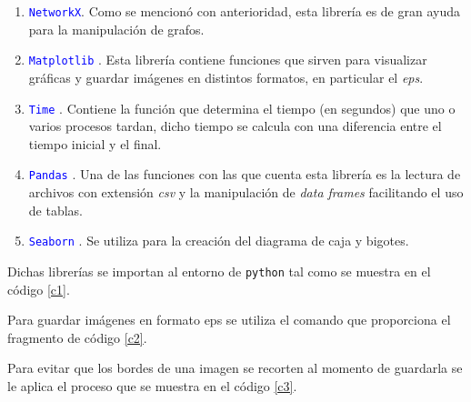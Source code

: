 \documentclass[12pt]{article}
\begin{document}
\begin{enumerate}
\item \textcolor{blue}{\texttt{NetworkX}}. Como se mencionó con anterioridad, esta librería es de gran ayuda para la manipulación de grafos.

\item \textcolor{blue}{\texttt{Matplotlib}} \cite{Mat}. Esta librería contiene funciones que sirven para visualizar gráficas y guardar imágenes en distintos formatos, en particular el \textit{eps}.
 
\item \textcolor{blue}{\texttt{Time}} \cite{PythonHow}. Contiene la función que determina el tiempo (en segundos) que uno o varios procesos tardan, dicho tiempo se calcula con una diferencia entre el tiempo inicial y el final.

\item \textcolor{blue}{\texttt{Pandas}} \cite{Pd}. Una de las funciones con las que cuenta esta librería es la lectura de archivos con extensión \textit{csv} y la manipulación de \textit{data frames} facilitando el uso de tablas.

\item \textcolor{blue}{\texttt{Seaborn}} \cite{sns}. Se utiliza para la creación del diagrama de caja y bigotes.

\end{enumerate}

Dichas librerías se importan al entorno de \texttt{python} tal como se muestra en el código \ref{c1}.

 \label{c1}


\newpage
Para guardar imágenes en formato eps se utiliza el comando que proporciona el fragmento de código \ref{c2}.

\vspace{.3cm}
 \label{c2}
 
\vspace{.6cm}

Para evitar que los bordes de una imagen se recorten al momento de guardarla se le aplica el proceso que se muestra en el código \ref{c3}.

\vspace{.3cm}
 \label{c3}

\end{document}
